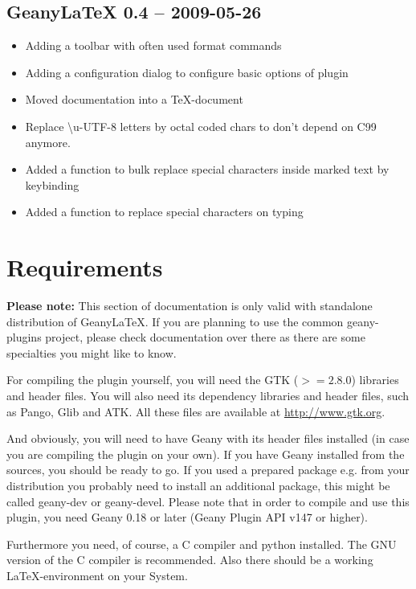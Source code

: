\documentclass[%
a4paper,%
10pt,%
oneside,%
DIV18,
headsepline,
plainheadsepline,
footsepline,
plainfootsepline,
bibtotoc,%
liststotoc,%
BCOR12mm,%
halfparskip,%
openany,%
]{scrartcl}
\begin{document}
\subsection*{GeanyLaTeX{} 0.4 -- 2009-05-26}
\begin{itemize}
	\item Adding a toolbar with often used format commands
	\item Adding a configuration dialog to configure basic options of plugin
	\item Moved documentation into a \TeX{}-document
	\item Replace \textbackslash{}u-UTF-8 letters by octal coded chars to
		  don't depend on C99 anymore.
	\item Added a function to bulk replace special characters
    	  inside marked text by keybinding
	\item Added a function to replace special characters on typing
\end{itemize}

\section{Requirements}

\small{\textbf{Please note:} This section of documentation is only 
valid with standalone distribution of Geany\LaTeX{}. If you are 
planning to use the common geany-plugins project, please check 
documentation over there as there are some specialties you might 
like to know.}

For compiling the plugin yourself, you will need the GTK ($>= 2.8.0$)
libraries and header files. You will also need its dependency
libraries and header files, such as Pango, Glib and ATK. All these
files are available at \url{http://www.gtk.org}.

And obviously, you will need to have Geany with its header files
installed (in case you are compiling the plugin on your own). If you
have Geany installed from the sources, you should be ready to go. If
you used a prepared package e.g. from your distribution you probably
need to install an additional package, this might be called geany-dev
or geany-devel. Please note that in order to compile and use this
plugin, you need Geany 0.18 or later (Geany Plugin API v147 or higher).

Furthermore you need, of course, a C compiler and python installed. The
GNU version of the C compiler is recommended. Also there should be a
working \LaTeX-environment on your System.
\end{document}
